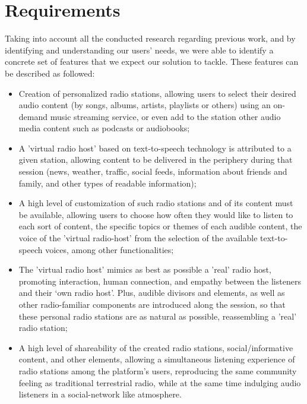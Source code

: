 \section{Requirements} 

Taking into account all the conducted research regarding previous work, and by identifying and understanding our users' needs, we were able to identify a concrete set of features that we expect our solution to tackle. These features can be described as followed:

\begin{itemize}
	\item Creation of personalized radio stations, allowing users to select their desired audio content (by songs, albums, artists, playlists or others) using an on-demand music streaming service, or even add to the station other audio media content such as podcasts or audiobooks;
	\item A 'virtual radio host' based on text-to-speech technology is attributed to a given station, allowing content to be delivered in the periphery during that session (news, weather, traffic, social feeds, information about friends and family, and other types of readable information);
	\item A high level of customization of such radio stations and of its content must be available, allowing users to choose how often they would like to listen to each sort of content, the specific topics or themes of each audible content, the voice of the 'virtual radio-host' from the selection of the available text-to-speech voices, among other functionalities;
	\item The 'virtual radio host' mimics as best as possible a 'real' radio host, promoting interaction, human connection, and empathy between the listeners and their ‘own radio host’. Plus, audible divisors and elements, as well as other radio-familiar components are introduced along the session, so that these personal radio stations are as natural as possible, reassembling a 'real' radio station;
	\item A high level of shareability of the created radio stations, social/informative content, and other elements, allowing a simultaneous listening experience of radio stations among the platform's users, reproducing the same community feeling as traditional terrestrial radio, while at the same time indulging audio listeners in a social-network like atmosphere.
\end{itemize}

